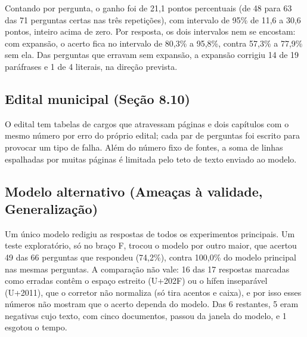 \documentclass[12pt]{article}
\begin{document}
Contando por pergunta, o ganho foi de 21,1 pontos percentuais (de 48 para 63 das 71 perguntas certas nas três repetições), com intervalo de 95\% de 11,6 a 30,6 pontos, inteiro acima de zero. Por resposta, os dois intervalos nem se encostam: com expansão, o acerto fica no intervalo de 80,3\% a 95,8\%, contra 57,3\% a 77,9\% sem ela. Das perguntas que erravam sem expansão, a expansão corrigiu 14 de 19 paráfrases e 1 de 4 literais, na direção prevista.

\subsection*{Edital municipal (Seção 8.10)}

O edital tem tabelas de cargos que atravessam páginas e dois capítulos com o mesmo número por erro do próprio edital; cada par de perguntas foi escrito para provocar um tipo de falha. Além do número fixo de fontes, a soma de linhas espalhadas por muitas páginas é limitada pelo teto de texto enviado ao modelo.

\subsection*{Modelo alternativo (Ameaças à validade, Generalização)}

Um único modelo redigiu as respostas de todos os experimentos principais. Um teste exploratório, só no braço F, trocou o modelo por outro maior, que acertou 49 das 66 perguntas que respondeu (74,2\%), contra 100,0\% do modelo principal nas mesmas perguntas. A comparação não vale: 16 das 17 respostas marcadas como erradas contêm o espaço estreito (U+202F) ou o hífen inseparável (U+2011), que o corretor não normaliza (só tira acentos e caixa), e por isso esses números não mostram que o acerto dependa do modelo. Das 6 restantes, 5 eram negativas cujo texto, com cinco documentos, passou da janela do modelo, e 1 esgotou o tempo.
\end{document}
